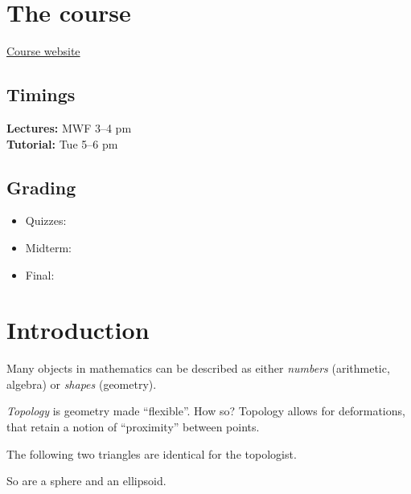 \chapter*{The course} \label{chp:course}

\href{https://sites.google.com/view/subhojoy/ma-231-2024}{Course website}

\section*{Timings} \label{sec:timings}
\textbf{Lectures:} MWF 3--4 pm\\
\textbf{Tutorial:} Tue 5--6 pm

\section*{Grading} \label{sec:grading}
\begin{itemize}
    \item Quizzes: 
    \item Midterm: 
    \item Final:   
\end{itemize}

\chapter{Introduction} \label{chp:intro}
Many objects in mathematics can be described as either \emph{numbers}
(arithmetic, algebra) or \emph{shapes} (geometry).

\emph{Topology} is geometry made ``flexible''.
How so? Topology allows for deformations, that retain a notion of
``proximity'' between points.

The following two triangles are identical for the topologist.
\begin{center}
    \quad%
\end{center}
So are a sphere and an ellipsoid.
\begin{center}
    \quad%
\end{center}

